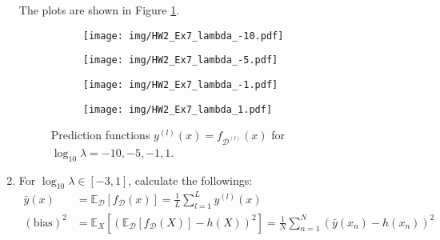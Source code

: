 \begin{exercise}
\begin{enumerate}
            \begin{solution}
                The plots are shown in Figure \ref{fig:predict-lambda}.
                \qedhere
                \begin{figure}[H]
                    \centering
                    \begin{subfigure}{0.45\textwidth}
                        \texttt{[image: img/HW2\_Ex7\_lambda\_-10.pdf]}
                        \vspace{2ex}
                    \end{subfigure}
                    \begin{subfigure}{0.45\textwidth}
                        \texttt{[image: img/HW2\_Ex7\_lambda\_-5.pdf]}
                        \vspace{2ex}
                    \end{subfigure}
                    \begin{subfigure}{0.45\textwidth}
                        \texttt{[image: img/HW2\_Ex7\_lambda\_-1.pdf]}
                    \end{subfigure}
                    \begin{subfigure}{0.45\textwidth}
                        \texttt{[image: img/HW2\_Ex7\_lambda\_1.pdf]}
                    \end{subfigure}
                    \caption{Prediction functions $y^{(l)}(x)=f_{\mathcal{D}^{(l)}}(x)$ for $\log_{10}\lambda = -10, -5,-1,1$.}
                    \label{fig:predict-lambda}
                \end{figure}
            \end{solution}
        \item For $\log_{10}\lambda\in [-3,1]$, calculate the followings:
            \begin{align*}
                \bar{y}(x)      & =\mathbb{E}_{\mathcal{D}}[f_{\mathcal{D}}(x)]=\frac{1}{L}\sum_{l=1}^L y^{(l)}(x)                                                                                                                        \\
                (\mbox{bias})^2 & =\mathbb{E}_X[(\mathbb{E}_{\mathcal{D}}[f_{\mathcal{D}}(X)]-h(X))^2]=\frac{1}{N}\sum_{n=1}^N (\bar{y}(x_n)-h(x_n))^2                                                                                    \\

\end{align*}
\end{enumerate}
\end{exercise}
